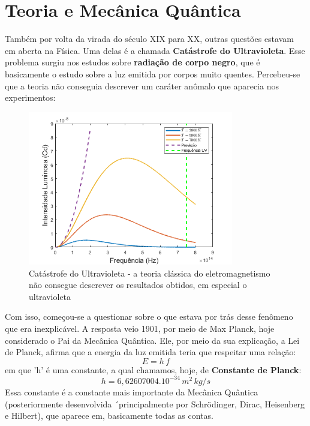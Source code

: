 \documentclass[12pt]{extarticle}
\newcommand{\<}{\langle}
\renewcommand{\>}{\rangle}
\theoremstyle{definition}
\begin{document}
\section{Teoria e Mecânica Quântica}
Também por volta da virada do século XIX para XX, outras questões estavam em aberta na Física. Uma delas é a chamada \textbf{Catástrofe do Ultravioleta}. Esse problema surgiu nos estudos sobre \textbf{radiação de corpo negro}, que é basicamente o estudo sobre a luz emitida por corpos muito quentes. Percebeu-se que a teoria não conseguia descrever um caráter anômalo que aparecia nos experimentos:
\begin{figure}[H]
    \centering
    \includegraphics[width=0.8\textwidth]{ultravioleta.png}
    \caption{Catástrofe do Ultravioleta - a teoria clássica do eletromagnetismo não consegue descrever os resultados obtidos, em especial o ultravioleta}
    \label{fig:uv_catastrophe}
\end{figure}

Com isso, começou-se a questionar sobre o que estava por trás desse fenômeno que era inexplicável. A resposta veio 1901, por meio de Max Planck, hoje considerado o Pai da Mecânica Quântica. Ele, por meio da sua explicação, a Lei de Planck, afirma que a energia da luz emitida teria que respeitar uma relação:
\begin{equation}
    E= h\,f
\end{equation}
\noindent em que 'h' é uma constante, a qual chamamos, hoje, de \textbf{Constante de Planck}:
\begin{equation}\label{eq:planck}
    h = 6,62607004 . 10^{-34}\, m^2\, kg / s
\end{equation}
Essa constante é a constante mais importante da Mecânica Quântica (posteriormente desenvolvida ´principalmente por Schrödinger, Dirac, Heisenberg e Hilbert), que aparece em, basicamente todas as contas.
\end{document}
